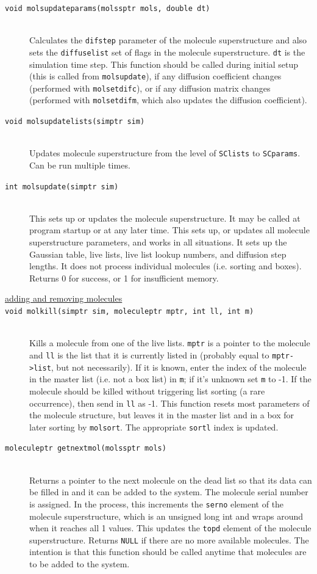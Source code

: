 \documentclass {scrbook}
\newcommand {\ttt} {\texttt}
\begin{document}
\begin{description}
\item[\ttt{void molsupdateparams(molssptr mols, double dt)}]
\hfill \\
Calculates the \ttt{difstep} parameter of the molecule superstructure and also sets the \ttt{diffuselist} set of flags in the molecule superstructure. \ttt{dt} is the simulation time step. This function should be called during initial setup (this is called from \ttt{molsupdate}), if any diffusion coefficient changes (performed with \ttt{molsetdifc}), or if any diffusion matrix changes (performed with \ttt{molsetdifm}, which also updates the diffusion coefficient).

\item[\ttt{void molsupdatelists(simptr sim)}]
\hfill \\
Updates molecule superstructure from the level of \ttt{SClists} to \ttt{SCparams}. Can be run multiple times.

\item[\ttt{int molsupdate(simptr sim)}]
\hfill \\
This sets up or updates the molecule superstructure. It may be called at program startup or at any later time. This sets up, or updates all molecule superstructure parameters, and works in all situations. It sets up the Gaussian table, live lists, live list lookup numbers, and diffusion step lengths. It does not process individual molecules (i.e. sorting and boxes). Returns 0 for success, or 1 for insufficient memory.

\item[\underline{adding and removing molecules}]

\item[\ttt{void molkill(simptr sim, moleculeptr mptr, int ll, int m)}]
\hfill \\
Kills a molecule from one of the live lists. \ttt{mptr} is a pointer to the molecule and \ttt{ll} is the list that it is currently listed in (probably equal to \ttt{mptr->list}, but not necessarily). If it is known, enter the index of the molecule in the master list (i.e. not a box list) in \ttt{m}; if it's unknown set \ttt{m} to -1. If the molecule should be killed without triggering list sorting (a rare occurrence), then send in \ttt{ll} as -1. This function resets most parameters of the molecule structure, but leaves it in the master list and in a box for later sorting by \ttt{molsort}. The appropriate \ttt{sortl} index is updated.

\item[\ttt{moleculeptr getnextmol(molssptr mols)}]
\hfill \\
Returns a pointer to the next molecule on the dead list so that its data can be filled in and it can be added to the system. The molecule serial number is assigned. In the process, this increments the \ttt{serno} element of the molecule superstructure, which is an unsigned long int and wraps around when it reaches all 1 values. This updates the \ttt{topd} element of the molecule superstructure. Returns \ttt{NULL} if there are no more available molecules. The intention is that this function should be called anytime that molecules are to be added to the system.


\end{description}
\end{document}
